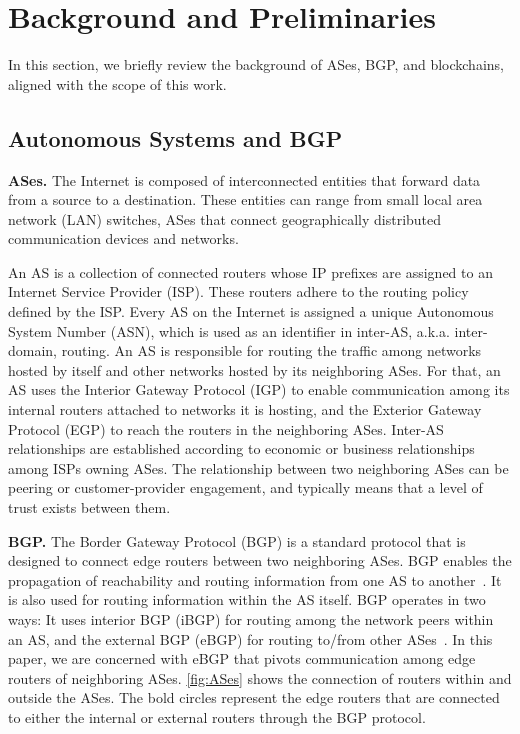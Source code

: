\documentclass[conference]{IEEEtran}
\newcommand{\BfPara}[1]{{\noindent\bf#1.}\xspace}
\begin{document}
\section{Background and Preliminaries}\label{sec:bg}
In this section, we briefly review the background of ASes, BGP, and blockchains, aligned with the scope of this work. 

\subsection{Autonomous Systems and BGP} \label{sec:AS}
\BfPara{ASes} The Internet is composed of interconnected entities that forward data from a source to a destination. These entities can range from small local area network (LAN) switches, ASes that connect geographically distributed communication devices and networks. 

An AS is a collection of connected routers whose IP prefixes are assigned to an Internet Service Provider (ISP). These routers adhere to the routing policy defined by the ISP. Every AS on the Internet is assigned a unique Autonomous System Number (ASN), which is used as an identifier in inter-AS, a.k.a. inter-domain, routing. An AS is responsible for routing the traffic among networks hosted by itself and other networks hosted by its neighboring ASes. For that, an AS uses the Interior Gateway Protocol (IGP) to enable communication among its internal routers attached to networks it is hosting, and the Exterior Gateway Protocol (EGP) to reach the routers in the neighboring ASes. Inter-AS relationships are established according to economic or business relationships among ISPs owning ASes. The relationship between two neighboring ASes can be peering or customer-provider engagement, and typically means that a level of trust exists between them.  


\BfPara{BGP}
The Border Gateway Protocol (BGP) is a standard protocol that is designed to connect edge routers between two neighboring ASes. BGP enables the propagation of reachability and routing information from one AS to another~\cite{rfc4271}. It is also used for routing information within the AS itself. BGP operates in two ways: It uses interior BGP (iBGP) for routing among the network peers within an AS, and the external BGP (eBGP) for routing to/from other ASes~\cite{rfc4271,SmithG96}. In this paper, we are concerned with eBGP that pivots communication among edge routers of neighboring ASes. \autoref{fig:ASes} shows the connection of routers within and outside the ASes. The bold circles represent the edge routers that are connected to either the internal or external routers through the BGP protocol. %
\end{document}
